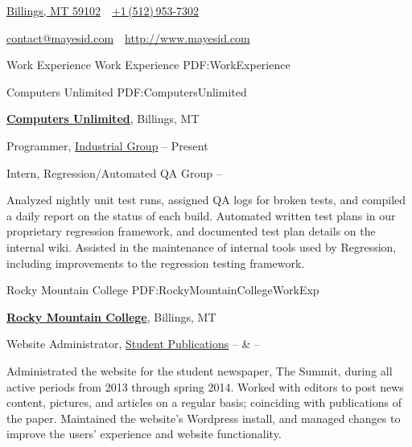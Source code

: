 \documentclass[letterpaper,MMMyyyy,nonstopmode]{simpleresumecv}
\newcommand{\CVAuthor}{Isaac Mayes}
\newcommand{\CVWebpage}{http://www.mayesid.com}
\begin{document}

\Title{\CVAuthor}

\begin{SubTitle}
\href{https://www.google.com/maps/place/Billings,+MT/}
{Billings, MT 59102}
\,\SubBulletSymbol\,
\href{tel:+15129537302}
{+1\,(512)\,953-7302}
\par
\href{mailto:contact@mayesid.com}
{contact@mayesid.com}
\,\SubBulletSymbol\,
\href{\CVWebpage}
{\url{\CVWebpage}}
\end{SubTitle}

\begin{Body}


\Section
{Work \newline Experience}
{Work Experience}
{PDF:WorkExperience}

\SubSection
{}
{Computers Unlimited}
{PDF:ComputersUnlimited}

\Entry
\href{http://www.cu.net}
{\textbf{Computers Unlimited}},
Billings, MT

\Gap
\BulletItem
Programmer,
\href{http://www.cu.net/industrial}
{Industrial Group}
\hfill
{} --
Present
\begin{Detail}
\end{Detail}

\Gap
\BulletItem
Intern,
Regression/Automated QA Group
\hfill
{} --
\begin{Detail}
\SubBulletItem
Analyzed nightly unit test runs, assigned QA logs for broken tests, and compiled a daily report on the status of each build.
\SubBulletItem
Automated written test plans in our proprietary regression framework, and documented test plan details on the internal wiki.
\SubBulletItem
Assisted in the maintenance of internal tools used by Regression, including improvements to the regression testing framework.
\end{Detail}

\SubSection
{}
{Rocky Mountain College}
{PDF:RockyMountainCollegeWorkExp}

\Entry
\href{http://www.rocky.edu}
{\textbf{Rocky Mountain College}},
Billings, MT

\Gap
\BulletItem
Website Administrator,
\href{http://summit.rocky.edu}
{Student Publications}
\hfill
{} --
 \&
 --
\begin{Detail}
\SubBulletItem
Administrated the website for the student newspaper, The Summit, during all active periods from 2013 through spring 2014.
\SubBulletItem
Worked with editors to post news content, pictures, and articles on a regular basis; coinciding with publications of the paper.
\SubBulletItem
Maintained the website's Wordpress install, and managed changes to improve the users' experience and website functionality.
\end{Detail}


\end{Body}
\end{document}
